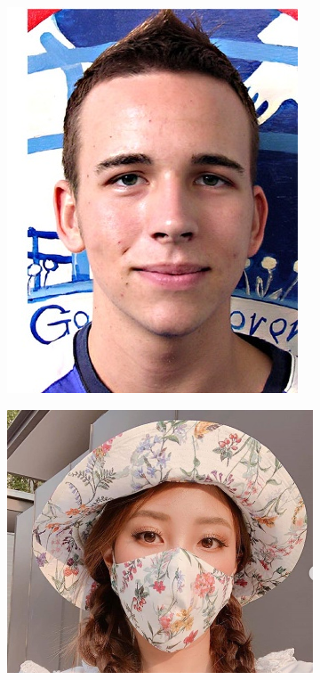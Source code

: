 \begin{figure}[htp]
\begin{subfigure}{0.2\linewidth}
		\includegraphics[width=\linewidth]{imagenes/dataset1-5.jpg}
		\caption{}
		\label{fig:1e}
	\end{subfigure}\hfill	
	\begin{subfigure}{0.2\linewidth}
		\includegraphics[width=\linewidth]{imagenes/dataset1-6.jpg}

\end{subfigure}
\end{figure}
